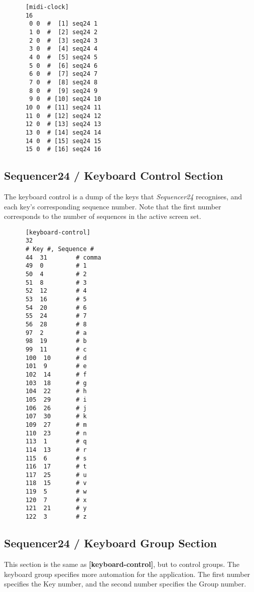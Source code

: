    \begin{verbatim}
      [midi-clock]
      16
       0 0  #  [1] seq24 1
       1 0  #  [2] seq24 2
       2 0  #  [3] seq24 3
       3 0  #  [4] seq24 4
       4 0  #  [5] seq24 5
       5 0  #  [6] seq24 6
       6 0  #  [7] seq24 7
       7 0  #  [8] seq24 8
       8 0  #  [9] seq24 9
       9 0  # [10] seq24 10
      10 0  # [11] seq24 11
      11 0  # [12] seq24 12
      12 0  # [13] seq24 13
      13 0  # [14] seq24 14
      14 0  # [15] seq24 15
      15 0  # [16] seq24 16
   \end{verbatim}

\subsection{Sequencer24 / Keyboard Control Section}
\label{subsec:seq24_rc_file_keyboard_control}
        
   The keyboard control is a dump of the keys that \textsl{Sequencer24}
   recognises, and each key's corresponding sequence number.
   Note that the first number corresponds to the number of sequences in
   the active screen set.

   \begin{verbatim}
      [keyboard-control]
      32
      # Key #, Sequence # 
      44  31        # comma
      49  0         # 1
      50  4         # 2
      51  8         # 3
      52  12        # 4
      53  16        # 5
      54  20        # 6
      55  24        # 7
      56  28        # 8
      97  2         # a
      98  19        # b
      99  11        # c
      100  10       # d
      101  9        # e
      102  14       # f
      103  18       # g
      104  22       # h
      105  29       # i
      106  26       # j
      107  30       # k
      109  27       # m
      110  23       # n
      113  1        # q
      114  13       # r
      115  6        # s
      116  17       # t
      117  25       # u
      118  15       # v
      119  5        # w
      120  7        # x
      121  21       # y
      122  3        # z
   \end{verbatim}

\subsection{Sequencer24 / Keyboard Group Section}
\label{subsec:seq24_rc_file_keyboard_group}

   This section is the same as
   \textbf{[keyboard-control]}, but to control groups.
   The keyboard group specifies more automation for the application.  The
   first number specifies the Key number, and the second number specifies
   the Group number.

